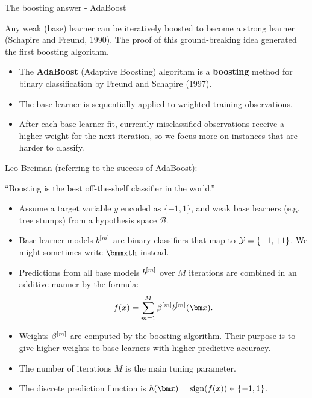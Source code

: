 \begin{vbframe}{The boosting answer - AdaBoost}

Any weak (base) learner can be iteratively boosted to become
a strong learner (Schapire and Freund, 1990).
The proof of this ground-breaking idea generated the first boosting algorithm.

\begin{itemize}
  \item The \textbf{AdaBoost} (Adaptive Boosting) algorithm is a \textbf{boosting} method
    for binary classification by Freund and Schapire (1997).
  \item The base learner is sequentially applied to weighted training observations.
  \item After each base learner fit, currently misclassified observations receive a higher weight for
    the next iteration, so we focus more on instances that are harder to classify.
\end{itemize}

Leo Breiman (referring to the success of AdaBoost):

\enquote{Boosting is the best off-the-shelf classifier in the world.}

\framebreak

\begin{itemize}
  \item Assume a target variable $y$ encoded as $\{-1,1\}$,
    and weak base learners (e.g. tree stumps) from a hypothesis space $\mathcal{B}$.
  \item Base learner models $b^{[m]}$ are binary classifiers that map to $\mathcal{Y} = \{-1,+1\}$.
    We might sometimes write $\bmmxth$ instead.
  \item Predictions from all base models $b^{[m]}$ over $M$ iterations are combined in an additive manner by the formula:
    $$
    \fx = \sum_{m=1}^{M} \betam \bmm(\xv).
    $$
  \item Weights $\beta^{[m]}$ are computed by the boosting algorithm.
    Their purpose is to give higher weights to base learners with higher predictive accuracy.
  \item The number of iterations $M$ is the main tuning parameter.
  \item The discrete prediction function is $h(\xv) = \text{sign}(\fx) \in \{-1,1\}$.
\end{itemize}


\end{vbframe}
